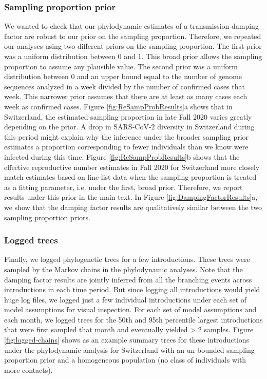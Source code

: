 \documentclass[9pt,twoside,lineno]{pnas-new}
\begin{document}
\subsubsection{Sampling proportion prior}
We wanted to check that our phylodynamic estimates of a transmission damping factor are robust to our prior on the sampling proportion. Therefore, we repeated our analyses using two different priors on the sampling proportion. The first prior was a uniform distribution between 0 and 1. This broad prior allows the sampling proportion to assume any plausible value. The second prior was a uniform distribution between 0 and an upper bound equal to the number of genome sequences analyzed in a week divided by the number of confirmed cases that week. This narrower prior assumes that there are at least as many cases each week as confirmed cases. Figure \ref{fig:ReSampProbResults}a shows that in Switzerland, the estimated sampling proportion in late Fall 2020 varies greatly depending on the prior. A drop in SARS-CoV-2 diversity in Switzerland during this period might explain why the inference under the broader sampling prior estimates a proportion corresponding to fewer individuals than we know were infected during this time. Figure \ref{fig:ReSampProbResults}b shows that the effective reproductive number estimates in Fall 2020 for Switzerland more closely match estimates based on line-list data when the sampling proportion is treated as a fitting parameter, i.e. under the first, broad prior. Therefore, we report results under this prior in the main text. In Figure \ref{fig:DampingFactorResults}a, we show that the damping factor results are qualitatively similar between the two sampling proportion priors. 

\subsubsection{Logged trees}
Finally, we logged phylogenetic trees for a few introductions. These trees were sampled by the Markov chains in the phylodynamic analyses. Note that the damping factor results are jointly inferred from all the branching events across introductions in each time period. But since logging all introductions would yield huge log files, we logged just a few individual introductions under each set of model assumptions for visual inspection. For each set of model assumptions and each month, we logged trees for the 50th and 95th percentile largest introductions that were first sampled that month and eventually yielded > 2 samples. Figure \ref{fig:logged-chains} shows as an example summary trees for these introductions under the phylodynamic analysis for Switzerland with an un-bounded sampling proportion prior and a homogeneous population (no class of individuals with more contacts).
\end{document}
